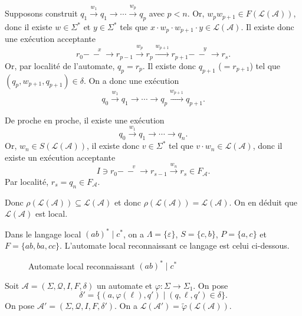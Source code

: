 \begin{prv}
\begin{itemize}
\begin{itemize}
					Supposons construit $q_1 \xrightarrow{w_1} q_1 \to \cdots \xrightarrow{w_p} q_p$\/ avec $p < n$.
					Or, $w_pw_{p+1} \in F(\mathcal{L}(\mathcal{A}))$, donc il existe $w \in \Sigma^*$\/ et $y \in \Sigma^*$\/ tels que $x \cdot w_p \cdot w_{p+1}\cdot y \in \mathcal{L}(\mathcal{A})$. Il existe donc une exécution acceptante  \[
						r_0 \overset x{-\ -\ \to} r_{p-1} \xrightarrow{w_p} r_p \xrightarrow{w_{p+1}} r_{p+1} \overset y{-\ -\ \to} r_s.
					\] Or, par localité de l'automate, $q_p = r_p$. Il existe donc $q_{p+1}$\/ ($= r_{p+1}$) tel que $(q_p, w_{p+1}, q_{p+1}) \in \delta$.
					On a donc une exécution \[
						q_0 \xrightarrow{w_1} q_1 \to \cdots \to q_p \xrightarrow{w_{p+1}} q_{p+1}
					.\]
			\end{itemize}
			De proche en proche, il existe une exécution \[
				q_0 \xrightarrow{w_1} q_1 \to \cdots \to q_n
			.\] Or, $w_n \in S(\mathcal{L}(\mathcal{A}))$, il existe donc $v \in \Sigma^*$\/ tel que $v \cdot w_n \in \mathcal{L}(\mathcal{A})$, donc il existe un exécution acceptante \[
				I\ni r_0 \overset v{-\ -\ \to} r_{s-1} \xrightarrow{w_n} r_s  \in F_\mathcal{A}
			.\]
			Par localité, $r_s = q_n \in F_\mathcal{A}$.

			Donc $\rho(\mathcal{L}(\mathcal{A})) \subseteq \mathcal{L}(\mathcal{A})$\/ et donc $\rho(\mathcal{L}(\mathcal{A})) = \mathcal{L}(\mathcal{A})$. On en déduit que $\mathcal{L}(\mathcal{A})$\/ est local.
	\end{itemize}
\end{prv}

\begin{exm}
	Dans le langage local $(ab)^*  \mid c^*$, on a $\Lambda = \{\varepsilon\}$, $S = \{c,b\}$, $P = \{a,c\}$\/ et $F = \{ab,ba,cc\}$.
	L'automate local reconnaissant ce langage est celui ci-dessous.
	\begin{figure}[H]
		\centering
		\caption{Automate local reconnaissant $(ab)^*  \mid c^*$}
	\end{figure}
\end{exm}

\begin{prop}
	Soit $\mathcal{A} = (\Sigma, \mathcal{Q}, I, F, \delta)$\/ un automate et $\varphi : \Sigma \to \Sigma_1$. On pose \[
		\delta' = \{(a,\varphi(\ell),q')  \mid (q, \ell, q') \in \delta\}
	.\] On pose $\mathcal{A}' = (\Sigma, \mathcal{Q}, I, F, \delta')$. On a $\mathcal{L}(\mathcal{A}') = \tilde\varphi(\mathcal{L}(\mathcal{A}))$.
\end{prop}

